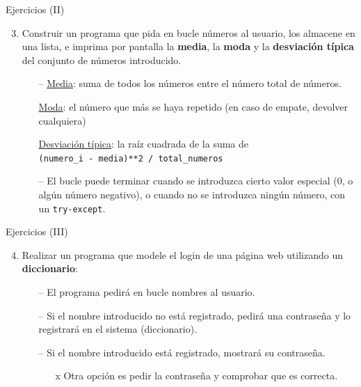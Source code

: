 \documentclass[10pt]{beamer} %
\begin{document}
\begin{frame}{Ejercicios (II)}
    \begin{enumerate}
        \setcounter{enumi}{2}
        \item Construir un programa que pida en bucle números al usuario, los almacene en una lista, e imprima por pantalla la \textbf{media}, la \textbf{moda} y la \textbf{desviación típica} del conjunto de números introducido.
        \begin{itemize}
            \item[--] \underline{Media}: suma de todos los números entre el número total de números.
            \item[] \underline{Moda}: el número que más se haya repetido (en caso de empate, devolver cualquiera)
            \item[] \underline{Desviación típica}: la raíz cuadrada de la suma de \\ \texttt{(numero\_i - media)**2 / total\_numeros}
            \item[--] El bucle puede terminar cuando se introduzca cierto valor especial (0, o algún número negativo), o cuando no se introduzca ningún número, con un \texttt{try-except}.
        \end{itemize}
    \end{enumerate}
\end{frame}

\begin{frame}{Ejercicios (III)}
    \begin{enumerate}
        \setcounter{enumi}{3}
        \item Realizar un programa que modele el login de una página web utilizando un \textbf{diccionario}:
        \begin{itemize}
            \item[--] El programa pedirá en bucle nombres al usuario.
            \item[--] Si el nombre introducido no está registrado, pedirá una contraseña y lo registrará en el sistema (diccionario).
            \item[--] Si el nombre introducido está registrado, mostrará su contraseña.
            \begin{itemize}
                \item[x] Otra opción es pedir la contraseña y comprobar que es correcta.
            \end{itemize}
        \end{itemize}
    \end{enumerate}
\end{frame}
\end{document}
